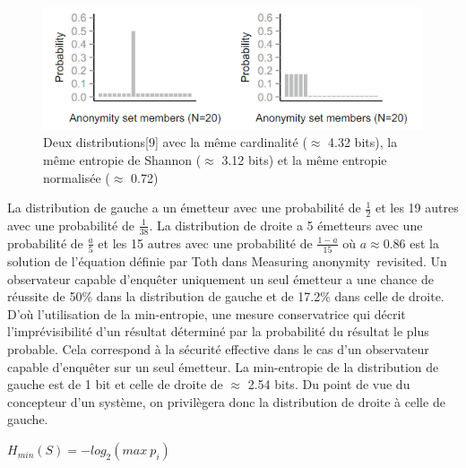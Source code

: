 \begin{figure}[h]
    \includegraphics[scale=0.8]{pics/plot.png}
    \caption{Deux distributions\cite{anon_quantify}[9] avec la même cardinalité ($\approx$ 4.32 bits), 
    la même entropie de Shannon ($\approx$ 3.12 bits) et la même entropie normalisée 
    ($\approx$ 0.72)}
\end{figure}

La distribution de gauche a un émetteur avec une probabilité de $\frac{1}{2}$
et les 19 autres avec une probabilité de $\frac{1}{38}$.
La distribution de droite a 5 émetteurs avec une probabilité de $\frac{a}{5}$
et les 15 autres avec une probabilité de $\frac{1-a}{15}$ où $a \approx 0.86$
est la solution de l'équation définie par Toth dans \og Measuring anonymity\
revisited\fg. Un observateur capable d'enquêter uniquement un seul émetteur a une 
chance de réussite de 50\% dans la distribution de gauche et de 17.2\%
dans celle de droite. D'où l'utilisation de la min-entropie, une mesure 
conservatrice qui décrit l'imprévisibilité d'un résultat déterminé par la 
probabilité du résultat le plus probable. Cela correspond à la sécurité effective
dans le cas d'un observateur capable d'enquêter sur un seul émetteur. 
La min-entropie de la distribution de gauche est de 1 bit et celle de droite de 
$\approx$ 2.54 bits. Du point de vue du concepteur d'un système, on privilègera 
donc la distribution de droite à celle de gauche.

\begin{definition}
    $H_{min}(S) = - log_2(max \: p_i)$
\end{definition}


